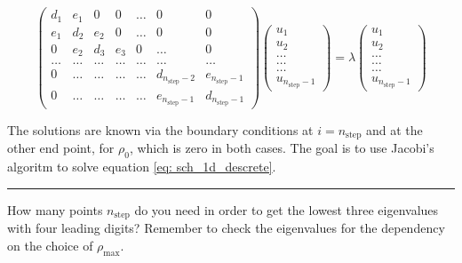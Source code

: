 \documentclass[11pt,a4wide]{article}
\begin{document}
\begin{equation}
    \left( \begin{array}{ccccccc} d_1 & e_1 & 0   & 0    & \dots  &0     & 0 \\
                                e_1 & d_2 & e_2 & 0    & \dots  &0     &0 \\
                                0   & e_2 & d_3 & e_3  &0       &\dots & 0\\
                                \dots  & \dots & \dots & \dots  &\dots      &\dots & \dots\\
                                0   & \dots & \dots & \dots  &\dots       &d_{n_{\mathrm{step}}-2} & e_{n_{\mathrm{step}}-1}\\
                                0   & \dots & \dots & \dots  &\dots       &e_{n_{\mathrm{step}}-1} & d_{n_{\mathrm{step}}-1}

             \end{array} \right)      \left( \begin{array}{c} u_{1} \\
                                                              u_{2} \\
                                                              \dots\\ \dots\\ \dots\\
                                                              u_{n_{\mathrm{step}}-1}
             \end{array} \right)=\lambda \left( \begin{array}{c} u_{1} \\
                                                              u_{2} \\
                                                              \dots\\ \dots\\ \dots\\
                                                              u_{n_{\mathrm{step}}-1}
             \end{array} \right) 
      \label{eq:sematrix}
\end{equation} 

The solutions are known via the boundary conditions at $i=n_{\mathrm{step}}$ and at the other end point, for  $\rho_0$, which is zero in both cases. The goal is to use Jacobi's algoritm to solve equation \ref{eq: sch_1d_descrete}.

\noindent\rule{\textwidth}{1pt}
How many points $n_{\mathrm{step}}$
do you need in order to get the lowest three eigenvalues 
with four leading digits?  
Remember to check the eigenvalues for 
the dependency on the choice of $\rho_{\mathrm{max}}$.
\end{document}
